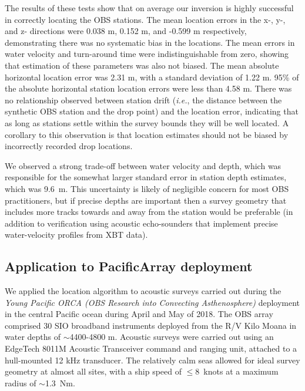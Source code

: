 The results of these tests show that on average our inversion is highly successful in correctly locating the OBS stations. The mean location errors in the x-, y-, and z- directions were 0.038 m, 0.152 m, and -0.599 m respectively, demonstrating there was no systematic bias in the locations. The mean errors in water velocity and turn-around time were indistinguishable from zero, showing that estimation of these parameters was also not biased. The mean absolute horizontal location error was 2.31 m, with a standard deviation of 1.22 m. 95\% of the absolute horizontal station location errors were less than 4.58 m. There was no relationship observed between station drift (\textit{i.e.}, the distance between the synthetic OBS station and the drop point) and the location error, indicating that as long as stations settle within the survey bounds they will be well located. A corollary to this observation is that location estimates should not be biased by incorrectly recorded drop locations. 

We observed a strong trade-off between water velocity and depth, which was responsible for the somewhat larger standard error in station depth estimates, which was \mbox{9.6 m}. This uncertainty is likely of negligible concern for most OBS practitioners, but if precise depths are important then a survey geometry that includes more tracks towards and away from the station would be preferable (in addition to verification using acoustic echo-sounders that implement precise water-velocity profiles from XBT data).

\subsection{Application to PacificArray deployment}
We applied the location algorithm to acoustic surveys carried out during the \textit{Young Pacific ORCA (OBS Research into Convecting Asthenosphere)} deployment in the central Pacific ocean during April and May of 2018. The OBS array comprised 30 SIO broadband instruments deployed from the R/V Kilo Moana in water depths of $\sim$4400-4800 m. Acoustic  surveys were carried out using an EdgeTech 8011M Acoustic Transceiver command and ranging unit, attached to a hull-mounted 12 kHz transducer. The relatively calm seas allowed for ideal survey geometry at almost all sites, with a ship speed of \mbox{$\le$8 knots} at a maximum radius of \mbox{$\sim$1.3 Nm}. 

